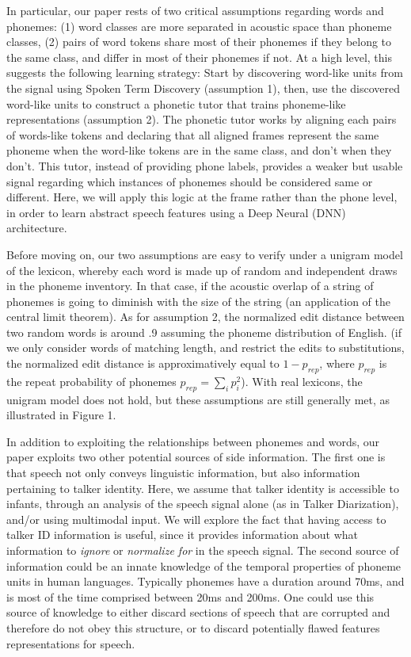 \documentclass[a4paper]{article}
\begin{document}
In particular, our paper rests of two critical assumptions regarding words and phonemes: (1) word classes are more separated in acoustic space than phoneme classes, (2) pairs of word tokens share most of their phonemes if they belong to the same class, and differ in most of their phonemes if not. At a high level, this suggests the following learning strategy: Start by discovering word-like units from the signal using Spoken Term Discovery  (assumption 1), then, use the discovered word-like units to construct a phonetic tutor that trains phoneme-like representations (assumption 2). The phonetic tutor works by aligning each pairs of words-like tokens and declaring that all aligned frames represent the same phoneme when the word-like tokens are in the same class, and don't when they don't. This tutor, instead of providing phone labels, provides a weaker but usable signal regarding which instances of phonemes should be considered same or different. Here, we will apply this logic at the frame rather than the phone level, in order to learn abstract speech features using a Deep Neural (DNN) architecture.  


Before moving on, our two assumptions are easy to verify under a unigram model of the lexicon, whereby each word is made up of random and independent draws in the phoneme inventory. In that case, if the acoustic overlap of a string of phonemes is going to diminish with the size of the string (an application of the central limit theorem). As for assumption 2, the normalized edit distance between two random words is around .9 assuming the phoneme distribution of English. (if we only consider words of matching length, and restrict the edits to substitutions, the normalized edit distance is approximatively equal to $1-p_{rep}$, where $p_{rep}$ is the repeat probability of phonemes $p_{rep}=\sum_i{p_i^2}$). With real lexicons, the unigram model does not hold, but these assumptions are still generally met, as illustrated in Figure 1. 

In addition to exploiting the relationships between phonemes and words, our paper exploits two other potential sources of side information. The first one is that speech not only conveys linguistic information, but also information pertaining to talker identity. Here, we assume that talker identity is accessible to infants, through an analysis of the speech signal alone (as in Talker Diarization), and/or using multimodal input. We will explore the fact that having access to talker ID information is useful, since it provides information about what information to \emph{ignore} or \emph{normalize for} in the speech signal. The second source of information could be an innate knowledge of the temporal properties of phoneme units in human languages. Typically phonemes have a duration around 70ms, and is most of the time comprised between 20ms and 200ms. One could use this source of knowledge to either discard sections of speech that are corrupted and therefore do not obey this structure, or to discard potentially flawed features representations for speech.
\end{document}
